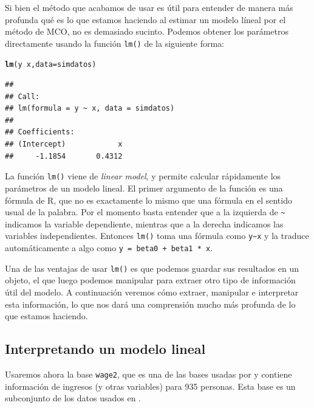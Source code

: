 \documentclass{article}\usepackage[]{graphicx}\usepackage[]{color}
\makeatletter
\newcommand{\hlopt}[1]{\textcolor[rgb]{0,0,0}{#1}}%
\newcommand{\hlstd}[1]{\textcolor[rgb]{0.345,0.345,0.345}{#1}}%
\newcommand{\hlkwc}[1]{\textcolor[rgb]{0.333,0.667,0.333}{#1}}%
\newcommand{\hlkwd}[1]{\textcolor[rgb]{0.737,0.353,0.396}{\textbf{#1}}}%
\newenvironment{kframe}{%
 \def\at@end@of@kframe{}%
 \ifinner\ifhmode%
  \def\at@end@of@kframe{\end{minipage}}%
  \begin{minipage}{\columnwidth}%
 \fi\fi%
 \def\FrameCommand##1{\hskip\@totalleftmargin \hskip-\fboxsep
 \colorbox{shadecolor}{##1}\hskip-\fboxsep
     \hskip-\linewidth \hskip-\@totalleftmargin \hskip\columnwidth}%
 \MakeFramed {\advance\hsize-\width
   \@totalleftmargin\z@ \linewidth\hsize
   \@setminipage}}%
 {\par\unskip\endMakeFramed%
 \at@end@of@kframe}
\newenvironment{knitrout}{}{} %
\newcommand*{\eng}[1]{\textsl{#1}}
\makeatother
\begin{document}
Si bien el método que acabamos de usar es útil para entender de manera más profunda qué es lo que estamos haciendo al estimar un modelo líneal por el método de MCO, no es demasiado sucinto. Podemos obtener los parámetros directamente usando la función \verb|lm()| de la siguiente forma:

\begin{knitrout}
\color{fgcolor}\begin{kframe}
\begin{alltt}
\hlkwd{lm}\hlstd{(y} \hlopt{~} \hlstd{x,} \hlkwc{data} \hlstd{= simdatos)}
\end{alltt}
\begin{verbatim}
## 
## Call:
## lm(formula = y ~ x, data = simdatos)
## 
## Coefficients:
## (Intercept)            x  
##     -1.1854       0.4312
\end{verbatim}
\end{kframe}
\end{knitrout}

La función \verb|lm()| viene de \eng{linear model}, y permite calcular rápidamente los parámetros de un modelo lineal. El primer argumento de la función es una fórmula de R, que no es exactamente lo mismo que una fórmula en el sentido usual de la palabra. Por el momento basta entender que a la izquierda de \verb|~| indicamos la variable dependiente, mientras que a la derecha indicamos las variables independientes. Entonces \verb|lm()| toma una fórmula como \verb|y~x| y la traduce automáticamente a algo como \verb|y = beta0 + beta1 * x|.

Una de las ventajas de usar \verb|lm()| es que podemos guardar sus resultados en un objeto, el que luego podemos manipular para extraer otro tipo de información útil del modelo. A continuación veremos cómo extraer, manipular e interpretar esta información, lo que nos dará una comprensión mucho más profunda de lo que estamos haciendo.


\subsection{Interpretando un modelo lineal}

Usaremos ahora la base \verb|wage2|, que es una de las bases usadas por \textcite{wooldridge_introductory_2013} y contiene información de ingresos (y otras variables) para 935 personas. Esta base es un subconjunto de los datos usados en \textcite{blackburn_unobserved_1992}.
\end{document}
